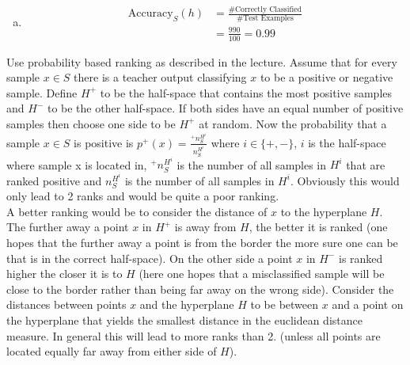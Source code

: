 \documentclass[10pt,a4paper,boxed]{hmcpset}
\begin{document}
				\begin{solution}		
					\begin{enumerate}[(a)]
						\item 
							\begin{align*}
								\textrm{Accuracy}_S(h) & = \frac{\textrm{\# Correctly Classified}}{\textrm{\#Test Examples}}\\
												       & = \frac{990}{100} = 0.99
							\end{align*}
					\end{enumerate}
				\end{solution}		
\begin{problem}[5. AUC]
\end{problem}
\begin{solution}
Use probability based ranking as described in the lecture. Assume that for every sample $x\in S$ there is a teacher output classifying $x$ to be a positive or negative sample. Define $H^+$ to be the half-space that contains the most positive samples and $H^-$ to be the other half-space. If both sides have an equal number of positive samples then choose one side to be $H^+$ at random. Now the probability that a sample $x\in S$ is positive is $p^+(x)=\frac{^+ n_S^{H^i}}{n_S^{H^i}}$ where $i\in\{+,-\}$, $i$ is the half-space where sample x is located in, $^+ n_S^{H^i}$ is the number of all samples in $H^i$ that are ranked positive and $n_S^{H^i}$ is the number of all samples in $H^i$. Obviously this would only lead to 2 ranks and would be quite a poor ranking.\\
A better ranking would be to consider the distance of $x$ to the hyperplane $H$. The further away a point $x$ in $H^+$ is away from $H$, the better it is ranked (one hopes that the further away a point is from the border the more sure one can be that is in the correct half-space). On the other side a point $x$ in $H^-$ is ranked higher the closer it is to $H$ (here one hopes that a misclassified sample will be close to the border rather than being far away on the wrong side). Consider the distances between points $x$ and the hyperplane $H$ to be between $x$ and a point on the hyperplane that yields the smallest distance in the euclidean distance measure. In general this will lead to more ranks than 2. (unless all points are located equally far away from either side of $H$).
\end{solution}
	
\end{document}

